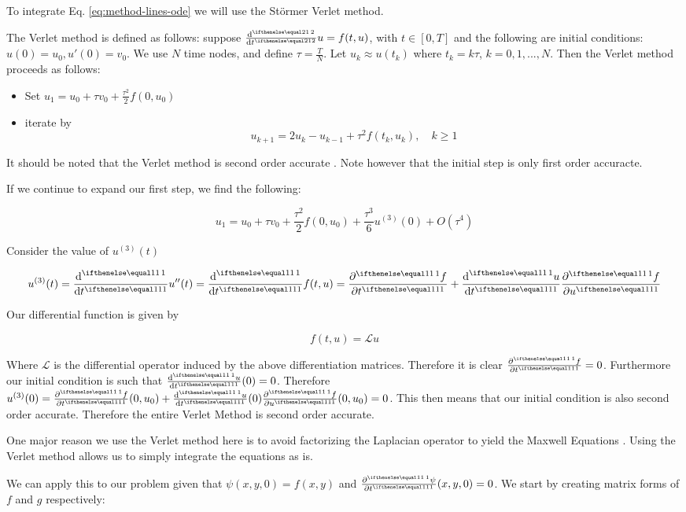 \documentclass{article}
\begin{document}
To integrate Eq. \ref{eq:method-lines-ode} we will use the
St\"ormer Verlet method.

The Verlet method is defined as follows:
suppose $\der[2]{}{t} u = f(t,u)$, with $t \in \left[0,T\right]$ and the
following are initial conditions:
$u(0) = u_0, u'(0) = v_0$.  We use $N$ time nodes, and define
$\tau = \frac{T}{N}$.  Let $u_k \approx u(t_k)$ where $t_k = k\tau$,
$k = 0, 1, ..., N$. Then the Verlet method proceeds as follows:

\begin{itemize}
  \item Set $u_1 = u_0 + \tau v_0 + \frac{\tau^2}{2} f(0,u_0)$
  \item iterate by
  $$u_{k+1} = 2u_k - u_{k-1} + \tau^2 f(t_k,u_k), \quad k \geq 1$$
\end{itemize}

It should be noted that the Verlet method is second order accurate
\cite{md-verlet}.  Note however that the initial step is only first order
accuracte.

If we continue to expand our first step, we find the following:

$$u_1 = u_0 + \tau v_0 + \frac{\tau^2}{2} f(0,u_0) +
\frac{\tau^3}{6} u^{(3)}(0) + O(\tau^4)$$

Consider the value of $u^{(3)}(t)$

$$u^{(3)}(t) = \der{}{t} u''(t) = \der{}{t} f(t,u) =
\pder{f}{t} + \der{u}{t} \pder{f}{u}$$

Our differential function is given by

$$f(t,u) = \mathcal{L} u$$

Where $\mathcal{L}$ is the differential operator induced by the above
differentiation matrices.  Therefore it is clear $\pder{f}{t} = 0$.
Furthermore our initial condition is such that $\der{u}{t} (0) = 0$.
Therefore $u^{(3)}(0) = \pder{f}{t}(0,u_0) + \der{u}{t}(0) \pder{f}{u} (0,u_0)
 = 0$.  This then means that our initial condition is also second order accurate.
 Therefore the entire Verlet Method is second order accurate.

 One major reason we use the Verlet method here is to avoid
 factorizing the Laplacian operator to yield the Maxwell Equations
 \cite{fnc-driscoll}.  Using the Verlet method allows us to simply integrate
 the equations as is.


We can apply this to our problem given that
$\psi(x,y,0) = f(x,y)$ and $\pder{\psi}{t}(x,y,0) = 0$.  We start
by creating matrix forms of $f$ and $g$ respectively:
\end{document}

